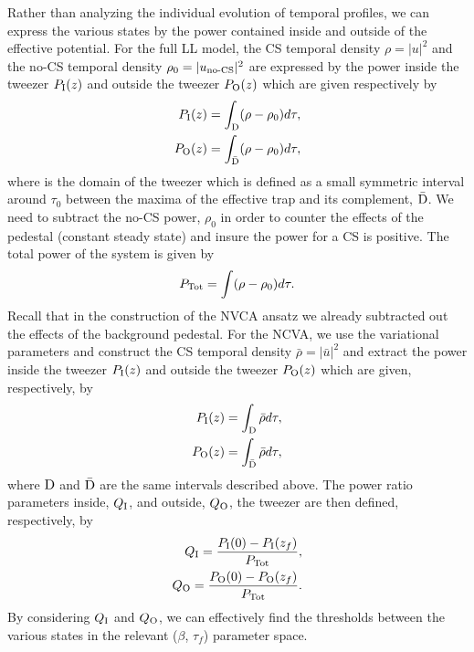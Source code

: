 Rather than analyzing the individual evolution of temporal profiles, we can express the various states by the power contained inside and outside of the effective potential.  For the full LL model, the CS temporal density $\rho = |u|^2$ and the no-CS temporal density $\rho_0 = |u_{\rm{no\text{-}CS}}|^2$ are expressed by the power inside the tweezer $P_{\rm I}(z)$ and outside the tweezer $P_{\rm O}(z)$ which are given respectively by 
\begin{align}
P_{\rm I}(z) = \int_{\rm D} (\rho - \rho_0) d\tau, \label{Pin} \\
P_{\rm O}(z) = \int_{\bar{\rm D}} (\rho - \rho_0) d\tau, \label{Pout}
\end{align} 
where  is the domain of the tweezer which is defined as a small symmetric interval around $\tau_0$ between the maxima of the effective trap and its complement, $\bar{\rm{D}}$.  We need to subtract the no-CS power, $\rho_0$ in order to counter the effects of the pedestal (constant steady state) and insure the power for a CS is positive.  The total power of the system is given by 
\begin{align}
P_{\rm Tot} = \int  (\rho - \rho_0) d\tau.
\end{align}
Recall that in the construction of the NVCA ansatz we already subtracted out the effects of the background pedestal.  For the NCVA, we use the variational parameters and construct the CS temporal density $\bar{\rho} = |\bar{u}|^2$ and extract the power inside the tweezer $P_{\rm I}(z)$ and outside the tweezer $P_{\rm O}(z)$ which are given, respectively, by 
\begin{align}
P_{\rm I}(z) = \int_{\rm D} \bar{\rho }d\tau, \label{PinNCVA} \\
P_{\rm O}(z) = \int_{\bar{\rm D}} \bar{\rho } d\tau, \label{PoutNCVA}
\end{align} 
where ${\rm D}$ and $\bar{{\rm D}}$ are the same intervals described above.
The power ratio parameters inside, $Q_{\rm I}$, and outside, $Q_{\rm O}$, the tweezer are then defined, respectively, by 
\begin{align}
Q_{\rm I} = \frac{P_{\rm I}(0) - P_{\rm I}(z_f)}{P_{\rm Tot} },\label{QIn} \\ 
Q_{\rm O}=  \frac{P_{\rm O}(0) - P_{\rm O}(z_f)}{P_{\rm Tot} }.
\label{QOut}
\end{align}
By considering $Q_{\rm I}$ and $Q_{\rm O}$, we can effectively find the thresholds between the various states in the relevant ($\beta$, $\tau_f$) parameter space.  

